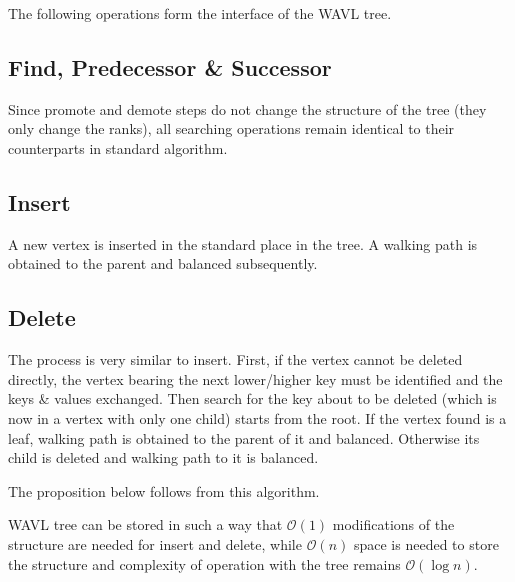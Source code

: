 The following operations form the interface of the WAVL tree.

\subsection{Find, Predecessor \& Successor}

Since promote and demote steps do not change the structure of the tree (they only change the ranks), all searching operations remain identical to their counterparts in standard algorithm.

\subsection{Insert}

A new vertex is inserted in the standard place in the tree. A walking path is obtained to the parent and balanced subsequently.

\subsection{Delete}

The process is very similar to insert. First, if the vertex cannot be deleted directly, the vertex bearing the next lower/higher key must be identified and the keys \& values exchanged. Then search for the key about to be deleted (which is now in a vertex with only one child) starts from the root. If the vertex found is a leaf, walking path is obtained to the parent of it and balanced. Otherwise its child is deleted and walking path to it is balanced.

The proposition below follows from this algorithm.

\begin{prop}
WAVL tree can be stored in such a way that $\mathcal{O}(1)$ modifications of the structure are needed for insert and delete, while $\mathcal{O}(n)$ space is needed to store the structure and complexity of operation with the tree remains $\mathcal{O}(\log n)$.
\end{prop}

